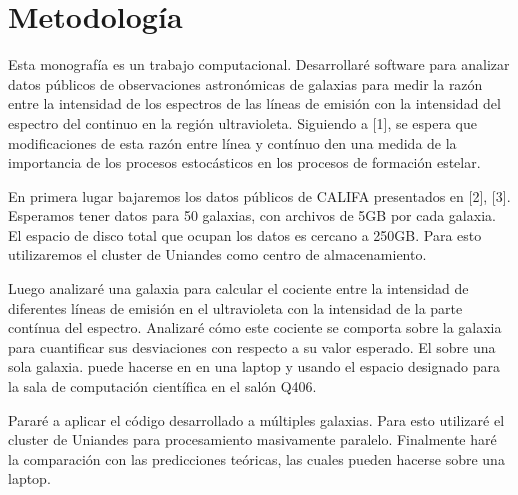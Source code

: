 \documentclass[12pt]{article}
\begin{document}
\section{Metodolog\'ia}



Esta monograf\'ia es un trabajo computacional. Desarrollar\'e software
para analizar datos p\'ublicos de observaciones astron\'omicas de
galaxias para medir la raz\'on entre la intensidad de los espectros de las
l\'ineas de emisi\'on con la intensidad del espectro del continuo en
la regi\'on ultravioleta.  Siguiendo a [1], se espera que
modificaciones de esta raz\'on entre l\'inea y cont\'inuo den una medida de la importancia de
 los procesos estoc\'asticos en los procesos de formaci\'on estelar.

En primera lugar bajaremos los datos p\'ublicos de CALIFA presentados
en [2], [3].
Esperamos tener datos para 50 galaxias, con archivos de 5GB por cada
galaxia.  
El espacio de disco total que ocupan los datos es cercano a 250GB. 
Para esto utilizaremos el cluster de Uniandes como centro de
almacenamiento.  

Luego analizar\'e una galaxia para calcular el cociente entre
la intensidad de diferentes l\'ineas de emisi\'on en el ultravioleta
con la intensidad de la parte cont\'inua del espectro. 
Analizar\'e c\'omo este cociente se comporta sobre la galaxia para
cuantificar sus desviaciones con respecto a su valor esperado. 
El sobre una sola galaxia. puede hacerse en  en una laptop y usando el
espacio designado para la sala de computaci\'on cient\'ifica en el
sal\'on Q406. 

Parar\'e a aplicar el c\'odigo desarrollado a m\'ultiples galaxias.
Para esto utilizar\'e el cluster de Uniandes para procesamiento masivamente
paralelo. 
Finalmente har\'e la comparaci\'on con las predicciones te\'oricas,
las cuales pueden hacerse sobre una laptop.


\end{document}
